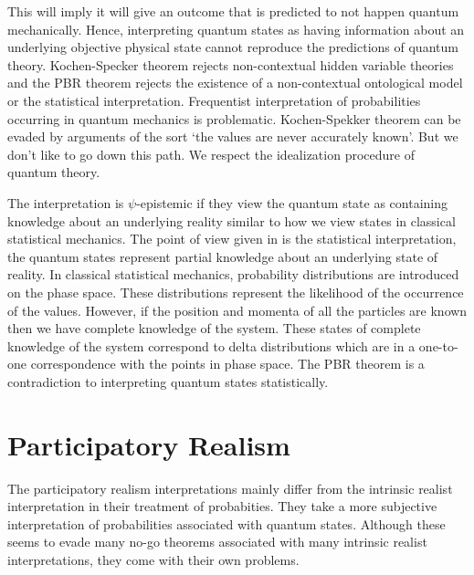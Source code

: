 \documentclass[11pt]{report}
\begin{document}
This will imply it will give an outcome that is predicted to not happen quantum mechanically. Hence, interpreting quantum states as having information about an underlying objective physical state cannot reproduce the predictions of quantum theory. Kochen-Specker theorem rejects non-contextual hidden variable theories and the PBR theorem rejects the existence of a non-contextual ontological model or the statistical interpretation. Frequentist interpretation of probabilities occurring in quantum mechanics is problematic. Kochen-Spekker theorem can be evaded by arguments of the sort `the values are never accurately known'. But we don't like to go down this path. We respect the idealization procedure of quantum theory. 

The interpretation is $\psi$-epistemic if they view the quantum state as containing knowledge about an underlying reality similar to how we view states in classical statistical mechanics. The point of view given in \cite{Ballentine2} is the statistical interpretation, the quantum states represent partial knowledge about an underlying state of reality.  In classical statistical mechanics, probability distributions are introduced on the phase space. These distributions represent the likelihood of the occurrence of the values. However, if the position and momenta of all the particles are known then we have complete knowledge of the system. These states of complete knowledge of the system correspond to delta distributions which are in a one-to-one correspondence with the points in phase space. The PBR theorem is a contradiction to interpreting quantum states statistically. 

\chapter{Participatory Realism}
The participatory realism interpretations mainly differ from the intrinsic realist interpretation in their treatment of probabities. They take a more subjective interpretation of probabilities associated with quantum states. Although these seems to evade many no-go theorems associated with many intrinsic realist interpretations, they come with their own problems.
\end{document}
